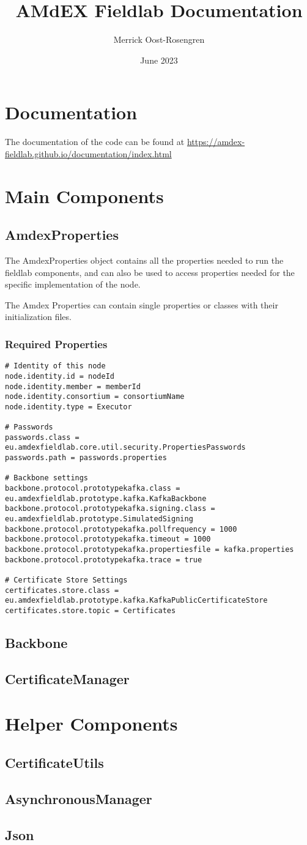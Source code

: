 \documentclass{article}
\title{AMdEX Fieldlab Documentation}
\author{Merrick Oost-Rosengren}
\date{June 2023}
\begin{document}
\maketitle

\section{Documentation}
The documentation of the code can be found at \url{https://amdex-fieldlab.github.io/documentation/index.html}

\section{Main Components}
\subsection{AmdexProperties}
The AmdexProperties object contains all the properties needed to run the fieldlab components, and can also be used to access properties needed for the specific implementation of the node.

The Amdex Properties can contain single properties or classes with their initialization files.
\subsubsection{Required Properties}
\begin{verbatim}
# Identity of this node
node.identity.id = nodeId
node.identity.member = memberId
node.identity.consortium = consortiumName
node.identity.type = Executor

# Passwords
passwords.class = eu.amdexfieldlab.core.util.security.PropertiesPasswords
passwords.path = passwords.properties

# Backbone settings
backbone.protocol.prototypekafka.class = eu.amdexfieldlab.prototype.kafka.KafkaBackbone
backbone.protocol.prototypekafka.signing.class = eu.amdexfieldlab.prototype.SimulatedSigning
backbone.protocol.prototypekafka.pollfrequency = 1000
backbone.protocol.prototypekafka.timeout = 1000
backbone.protocol.prototypekafka.propertiesfile = kafka.properties
backbone.protocol.prototypekafka.trace = true

# Certificate Store Settings
certificates.store.class = eu.amdexfieldlab.prototype.kafka.KafkaPublicCertificateStore
certificates.store.topic = Certificates

\end{verbatim}
\subsection{Backbone}
\subsection{CertificateManager}
\section{Helper Components}
\subsection{CertificateUtils}
\subsection{AsynchronousManager}
\subsection{Json}
\end{document}
